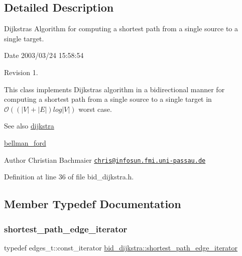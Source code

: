 \subsection{Detailed Description}
Dijkstra\textquotesingle{}s Algorithm for computing a shortest path from a single source to a single target. 

\begin{DoxyParagraph}{Date}
2003/03/24 15\+:58\+:54 
\end{DoxyParagraph}
\begin{DoxyParagraph}{Revision}
1. 
\end{DoxyParagraph}


This class implements Dijkstra\textquotesingle{}s algorithm in a bidirectional manner for computing a shortest path from a single source to a single target in $\mathcal{O}((|V| + |E|) log |V|)$ worst case.

\begin{DoxySeeAlso}{See also}
\mbox{\hyperlink{classdijkstra}{dijkstra}} 

\mbox{\hyperlink{classbellman__ford}{bellman\+\_\+ford}}
\end{DoxySeeAlso}
\begin{DoxyAuthor}{Author}
Christian Bachmaier \href{mailto:chris@infosun.fmi.uni-passau.de}{\tt chris@infosun.\+fmi.\+uni-\/passau.\+de} 
\end{DoxyAuthor}


Definition at line 36 of file bid\+\_\+dijkstra.\+h.



\subsection{Member Typedef Documentation}
\mbox{\label{classbid__dijkstra_a12c551a4f2fea9d38d2b6488278e3a09}} 
\subsubsection{\texorpdfstring{shortest\+\_\+path\+\_\+edge\+\_\+iterator}{shortest\_path\_edge\_iterator}}
{\footnotesize\ttfamily typedef edges\+\_\+t\+::const\+\_\+iterator \mbox{\hyperlink{classbid__dijkstra_a12c551a4f2fea9d38d2b6488278e3a09}{bid\+\_\+dijkstra\+::shortest\+\_\+path\+\_\+edge\+\_\+iterator}}}



